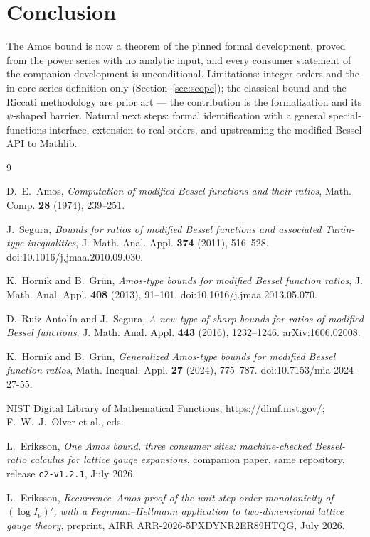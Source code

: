 \documentclass[11pt]{article}
\newcommand{\lean}[1]{\texttt{#1}}
\begin{document}
\section{Conclusion}

The Amos bound is now a theorem of the pinned formal development,
proved from the power series with no analytic input, and every
consumer statement of the companion development is unconditional.  Limitations: integer orders
and the in-core series definition only (Section~\ref{sec:scope});
the classical bound and the Riccati methodology are prior art ---
the contribution is the formalization and its $\psi$-shaped barrier.
Natural next steps: formal identification with a general
special-functions interface, extension to real orders, and
upstreaming the modified-Bessel API to Mathlib.

\begin{thebibliography}{9}

 D.~E.~Amos,
\emph{Computation of modified Bessel functions and their ratios},
Math. Comp. \textbf{28} (1974), 239--251.

 J.~Segura,
\emph{Bounds for ratios of modified Bessel functions and associated
Tur\'an-type inequalities},
J. Math. Anal. Appl. \textbf{374} (2011), 516--528.
doi:10.1016/j.jmaa.2010.09.030.

 K.~Hornik and B.~Gr\"un,
\emph{Amos-type bounds for modified Bessel function ratios},
J. Math. Anal. Appl. \textbf{408} (2013), 91--101.
doi:10.1016/j.jmaa.2013.05.070.

 D.~Ruiz-Antol\'in and J.~Segura,
\emph{A new type of sharp bounds for ratios of modified Bessel
functions}, J. Math. Anal. Appl. \textbf{443} (2016), 1232--1246.
arXiv:1606.02008.

 K.~Hornik and B.~Gr\"un,
\emph{Generalized Amos-type bounds for modified Bessel function
ratios}, Math. Inequal. Appl. \textbf{27} (2024), 775--787.
doi:10.7153/mia-2024-27-55.

 NIST Digital Library of Mathematical Functions,
\url{https://dlmf.nist.gov/}; F.~W.~J.~Olver et al., eds.

 L.~Eriksson,
\emph{One Amos bound, three consumer sites: machine-checked
Bessel-ratio calculus for lattice gauge expansions}, companion
paper, same repository, release \lean{c2-v1.2.1}, July 2026.

 L.~Eriksson,
\emph{Recurrence--Amos proof of the unit-step order-monotonicity of
$(\log I_\nu)'$, with a Feynman--Hellmann application to
two-dimensional lattice gauge theory}, preprint,
AIRR ARR-2026-5PXDYNR2ER89HTQG, July 2026.


\end{thebibliography}
\end{document}
